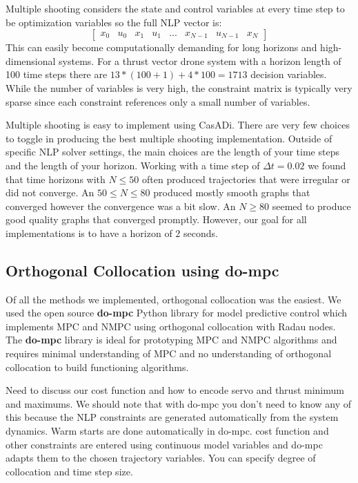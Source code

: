 \documentclass[]{article}
\newcommand{\casadi}{CasADi}
\begin{document}
	Multiple shooting considers the state and control variables at every time step to be optimization variables so the full NLP vector is:
        \[
        \begin{bmatrix}
        x_0 & u_0 & x_1 & u_1 & ... & x_{N-1} & u_{N-1} & x_N
        \end{bmatrix}
        \]
	This can easily become computationally demanding for long horizons and high-dimensional systems. For a thrust vector drone system with a  horizon length of 100 time steps there are $13 * (100+1)+4*100=1713$ decision variables. While the number of variables is very high, the constraint matrix is typically very sparse since each constraint references only a small number of variables.

	Multiple shooting is easy to implement using {\casadi}.  There are very few choices to toggle in producing the best multiple shooting implementation. Outside of specific NLP solver settings, the main choices are the length of your time steps and the length of your horizon.   Working with a time step of $\Delta t = 0.02$ we found that time horizons with $N \leq 50$  often produced trajectories that were irregular or did not converge. An $50 \leq N \leq 80$ produced mostly smooth graphs that converged however the convergence was a bit slow.  An $N \geq 80$ seemed to produce good quality graphs that converged promptly. However, our goal for all implementations is to have a horizon of $2$ seconds. 
	

	

\subsection*{Orthogonal Collocation using {do-mpc}} 
Of all the methods we implemented, orthogonal collocation was the easiest. We used the open source {\bf do-mpc} Python library for model predictive control  \citep{do-mpc}   which implements MPC and NMPC using orthogonal collocation with Radau nodes.
The {\bf do-mpc} library is ideal for prototyping  MPC and NMPC algorithms and requires minimal understanding of MPC and no understanding of orthogonal collocation to build functioning algorithms.

Need to discuss our cost function and how to encode servo and thrust minimum and maximums.  We should note that with do-mpc you don't need to know any of this because the NLP constraints are generated automatically from the system dynamics. Warm starts are done automatically in do-mpc. cost function and other constraints are entered using continuous model variables and do-mpc adapts them to the chosen trajectory variables. You can specify degree of collocation and time step size.
\end{document}
